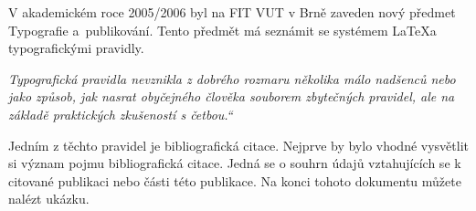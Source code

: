 \documentclass[a4paper, 11pt]{article}
\newcommand{\myuv}[1]{\quotedblbase #1\textquotedblleft}
\begin{document}
V akademickém roce 2005/2006 byl na FIT VUT v Brně zaveden nový předmet Typografie a~publikování. \citep{Krena:typografie} Tento předmět má seznámit se systémem \LaTeX a typografickými pravidly. 

\emph{\myuv{Typografická pravidla nevznikla z dobrého rozmaru několika málo nadšenců nebo jako způsob, jak nasrat obyčejného člověka souborem zbytečných pravidel, ale na základě praktických zkušeností s četbou.}} \citep{Pecina:typomil}

Jedním z těchto pravidel je bibliografická citace. Nejprve by bylo vhodné vysvětlit si význam pojmu bibliografická citace. Jedná se o souhrn údajů vztahujících se k citované publikaci nebo části této publikace. \citep{Pysny:bibtex} Na konci tohoto dokumentu můžete nalézt ukázku. \citep{Johannes_Bergerhausen:demokratizace}




\newpage


\renewcommand{\refname}{Literatura}

\end{document}
